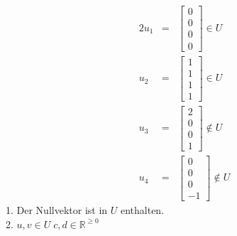 \documentclass[10pt,a4paper,oneside,ngerman,numbers=noenddot]{scrartcl}
\begin{document}
\subsection{} %
\begin{alignat*}{2}
u_{1} &=& \begin{bmatrix}
0 \\
0 \\
0 \\
0
\end{bmatrix} \in U \\
u_{2} &=& \begin{bmatrix}
1 \\
1 \\
1 \\
1
\end{bmatrix} \in U \\
u_{3} &=& \begin{bmatrix}
2 \\
0 \\
0 \\
1
\end{bmatrix} \not\in U \\
u_{4} &=& \begin{bmatrix}
0 \\
0 \\
0 \\
-1
\end{bmatrix} \not\in U
\end{alignat*}
1. Der Nullvektor ist in $U$ enthalten. \\
2. $u,v \in U \; c,d \in \mathbb{R}^{\geq 0}$
\end{document}
